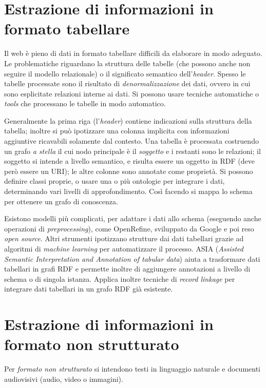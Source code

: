 \documentclass[11pt]{article}
\begin{document}
\section{Estrazione di informazioni in formato tabellare}
Il web è pieno di dati in formato tabellare difficili da elaborare in modo adeguato.
Le problematiche riguardano la struttura delle tabelle (che possono anche non seguire il modello relazionale) o il significato semantico dell'\textit{header}.
Spesso le tabelle processate sono il risultato di \textit{denormalizzazione} dei dati, ovvero in cui sono esplicitate relazioni interne ai dati.
Si possono usare tecniche automatiche o \textit{tools} che processano le tabelle in modo automatico.

Generalmente la prima riga (l'\textit{header}) contiene indicazioni sulla struttura della tabella; inoltre si può ipotizzare una colonna implicita con informazioni aggiuntive ricavabili solamente dal contesto.
Una tabella è processata costruendo un grafo \textit{a stella} il cui nodo principale è il \textit{soggetto} e i restanti sono le relazioni; il soggetto si intende a livello semantico, e risulta essere un oggetto in RDF (deve però essere un URI); le altre colonne sono annotate come proprietà.
Si possono definire classi proprie, o usare una o più ontologie per integrare i dati, determinando vari livelli di approfondimento.
Così facendo si mappa lo schema per ottenere un grafo di conoscenza.

Esistono modelli più complicati, per adattare i dati allo schema (eseguendo anche operazioni di \textit{preprocessing}), come OpenRefine, sviluppato da Google e poi reso \textit{open source}.
Altri strumenti ipotizzano strutture dai dati tabellari grazie ad algoritmi di \textit{machine learning} per automatizzare il processo.
ASIA (\textit{Assisted Semantic Interpretation and Annotation of tabular data}) aiuta a trasformare dati tabellari in grafi RDF e permette inoltre di aggiungere annotazioni a livello di schema o di singola istanza.
Applica inoltre tecniche di \textit{record linkage} per integrare dati tabellari in un grafo RDF già esistente.

\section{Estrazione di informazioni in formato non strutturato}
Per \textit{formato non strutturato} si intendono testi in linguaggio naturale e documenti audiovisivi (audio, video o immagini).
\end{document}
